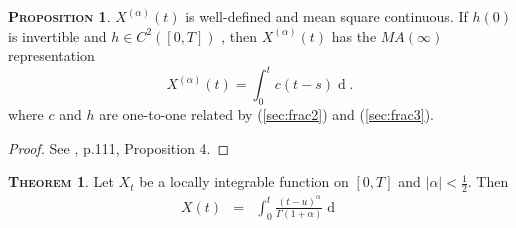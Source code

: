 \documentclass[a4paper, twoside, 11pt]{article}
\theoremstyle{definition}
\newtheorem{theorem}[definition]{\scshape Theorem}
\newtheorem{proposition}[definition]{\scshape Proposition}
\begin{document}
\begin{proposition}
  $ X^{(\alpha)}(t)$ is well-defined and mean square continuous. If $h(0)$ is invertible and $h \in C^2([0, T])$ , then $X^{(\alpha)}(t)$ has the $MA(\infty)$ representation
  $$X^{(\alpha)}(t) = \int_0^t c(t-s) \mathop{dB_s}.$$
  where $c$ and $h$ are one-to-one related by (\ref{sec:frac2}) and (\ref{sec:frac3}).
\end{proposition}
\begin{proof}
  See  \cite{core}, p.111, Proposition 4.
  \end{proof}
  \begin{theorem}
	Let  $X_t$ be a locally integrable function on $[0, T]$ and $|\alpha| < \frac{1}{2}$. Then
	\begin{eqnarray}
	X(t) &=& \int_0^t \frac{(t-u)^\alpha}{\Gamma(1+\alpha)}\mathop{dX^{(\alpha)}_u}
	\label{sec:imp}
  \end{eqnarray}
  \end{theorem}
\end{document}
